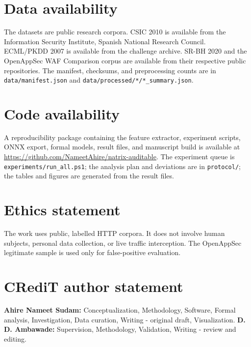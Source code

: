 \documentclass[preprint,11pt]{elsarticle}
\begin{document}
\section*{Data availability}\label{data-availability}

The datasets are public research corpora. CSIC 2010 is available from
the Information Security Institute, Spanish National Research Council.
ECML/PKDD 2007 is available from the challenge archive. SR-BH 2020 and
the OpenAppSec WAF Comparison corpus are available from their respective
public repositories. The manifest, checksums, and preprocessing counts
are in \texttt{data/\allowbreak{}manifest.\allowbreak{}json} and
\texttt{data/\allowbreak{}processed/\allowbreak{}*/\allowbreak{}*\_\allowbreak{}summary.\allowbreak{}json}.

\section*{Code availability}\label{code-availability}

A reproducibility package containing the feature extractor, experiment
scripts, ONNX export, formal models, result files, and manuscript build
is available at \url{https://github.com/NameetAhire/natrix-auditable}.
The experiment queue is \texttt{experiments/\allowbreak{}run\_\allowbreak{}all.\allowbreak{}ps1}; the analysis
plan and deviations are in \texttt{protocol/\allowbreak{}}; the tables and figures
are generated from the result files.

\section*{Ethics statement}\label{ethics-statement}

The work uses public, labelled HTTP corpora. It does not involve human
subjects, personal data collection, or live traffic interception. The
OpenAppSec legitimate sample is used only for false-positive evaluation.

\section*{CRediT author statement}\label{credit-author-statement}

\textbf{Ahire Nameet Sudam:} Conceptualization, Methodology, Software,
Formal analysis, Investigation, Data curation, Writing - original draft,
Visualization. \textbf{D. D. Ambawade:} Supervision, Methodology,
Validation, Writing - review and editing.
\end{document}
